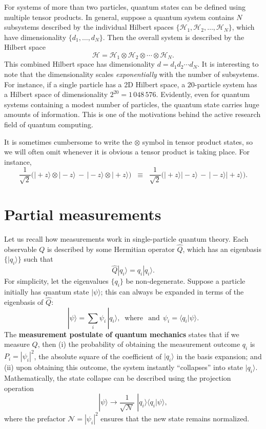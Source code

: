 \documentclass[pra,12pt]{revtex4}
\begin{document}
For systems of more than two particles, quantum states can be defined
using multiple tensor products.  In general, suppose a quantum system
contains $N$ subsystems described by the individual Hilbert spaces
$\{\mathscr{H}_1, \mathscr{H}_2, \dots, \mathscr{H}_N\}$, which have
dimensionality $\{d_1, \dots, d_N\}$.  Then the overall system is
described by the Hilbert space
$$\mathscr{H} = \mathscr{H}_1 \otimes \mathscr{H}_2 \otimes \cdots
\otimes \mathscr{H}_N.$$
This combined Hilbert space has dimensionality $d = d_1 d_2\cdots
d_N$.  It is interesting to note that the dimensionality scales
\textit{exponentially} with the number of subsystems.  For instance,
if a single particle has a 2D Hilbert space, a $20$-particle system
has a Hilbert space of dimensionality $2^{20} =1\,048\,576$.
Evidently, even for quantum systems containing a modest number of
particles, the quantum state carries huge amounts of information.
This is one of the motivations behind the active research field of
quantum computing.

It is sometimes cumbersome to write the $\otimes$ symbol in tensor
product states, so we will often omit whenever it is obvious a tensor
product is taking place.  For instance,
$$\frac{1}{\sqrt{2}} \Big(|\!+\!z\rangle\otimes|\!-\!z\rangle \,-\, |\!-\!z\rangle\otimes|\!+\!z\rangle\Big) \;\;\equiv \;\; \frac{1}{\sqrt{2}} \Big(|\!+\!z\rangle|\!-\!z\rangle \,-\, |\!-\!z\rangle|\!+\!z\rangle\Big).$$


\section{Partial measurements}
\label{sec:partialmeasurements}

Let us recall how measurements work in single-particle quantum theory.
Each observable $Q$ is described by some Hermitian operator $\hat{Q}$,
which has an eigenbasis $\{|q_i\rangle\}$ such that
$$\hat{Q}|q_i\rangle = q_i |q_i\rangle.$$
For simplicity, let the eigenvalues $\{q_i\}$ be non-degenerate.
Suppose a particle initially has quantum state $|\psi\rangle$; this
can always be expanded in terms of the eigenbasis of $\hat{Q}$:
$$|\psi\rangle = \sum_i \psi_i\, |q_i\rangle, \;\;\mathrm{where}\;\;\,\textrm{and}\;\, \psi_i = \langle q_i|\psi\rangle.$$
The \textbf{measurement postulate of quantum mechanics} states that if
we measure $Q$, then (i) the probability of obtaining the measurement
outcome $q_i$ is $P_i = |\psi_i|^2$, the absolute square of the
coefficient of $|q_i\rangle$ in the basis expansion; and (ii) upon
obtaining this outcome, the system instantly ``collapses'' into state
$|q_i\rangle$.  Mathematically, the state collapse can be described
using the projection operation
$$|\psi\rangle \longrightarrow \frac{1}{\sqrt{\mathcal{N}}}\; |q_i\rangle\langle q_i|\psi\rangle,$$
where the prefactor $\mathcal{N} = |\psi_i|^2$ ensures that the new
state remains normalized.
\end{document}

